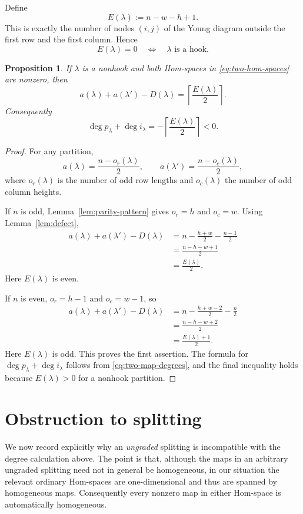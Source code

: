 \documentclass[11pt,reqno]{amsart}
\numberwithin{equation}{section}
\newtheorem{proposition}[theorem]{Proposition}
\theoremstyle{remark}
\begin{document}
Define
\[
E(\lambda):=n-w-h+1.
\]
This is exactly the number of nodes $(i,j)$ of the Young diagram outside the first row and the first column.  Hence
\[
E(\lambda)=0\quad\Longleftrightarrow\quad\lambda\text{ is a hook}.
\]

\begin{proposition}\label{prop:degree-formula}
If $\lambda$ is a nonhook and both Hom-spaces in \eqref{eq:two-hom-spaces} are nonzero, then
\[
a(\lambda)+a(\lambda')-D(\lambda)
=
\left\lceil\frac{E(\lambda)}2\right\rceil.
\]
Consequently
\[
\deg p_\lambda+\deg i_\lambda
=
-\left\lceil\frac{E(\lambda)}2\right\rceil<0.
\]
\end{proposition}

\begin{proof}
For any partition,
\[
a(\lambda)=\frac{n-o_r(\lambda)}2,
\qquad
a(\lambda')=\frac{n-o_c(\lambda)}2,
\]
where $o_r(\lambda)$ is the number of odd row lengths and $o_c(\lambda)$ the number of odd column heights.

If $n$ is odd, Lemma~\ref{lem:parity-pattern} gives $o_r=h$ and $o_c=w$.  Using Lemma~\ref{lem:defect},
\begin{align*}
a(\lambda)+a(\lambda')-D(\lambda)
&=n-\frac{h+w}{2}-\frac{n-1}{2}\\
&=\frac{n-h-w+1}{2}\\
&=\frac{E(\lambda)}2.
\end{align*}
Here $E(\lambda)$ is even.

If $n$ is even, $o_r=h-1$ and $o_c=w-1$, so
\begin{align*}
a(\lambda)+a(\lambda')-D(\lambda)
&=n-\frac{h+w-2}{2}-\frac n2\\
&=\frac{n-h-w+2}{2}\\
&=\frac{E(\lambda)+1}{2}.
\end{align*}
Here $E(\lambda)$ is odd.  This proves the first assertion.  The formula for $\deg p_\lambda+\deg i_\lambda$ follows from \eqref{eq:two-map-degrees}, and the final inequality holds because $E(\lambda)>0$ for a nonhook partition.
\end{proof}

\section{Obstruction to splitting}

We now record explicitly why an \emph{ungraded} splitting is
incompatible with the degree calculation above.  The point is that,
although the maps in an arbitrary ungraded splitting need not in
general be homogeneous, in our situation the relevant ordinary
Hom-spaces are one-dimensional and thus are spanned by homogeneous maps.
Consequently every nonzero map in either Hom-space is automatically
homogeneous.
\end{document}

